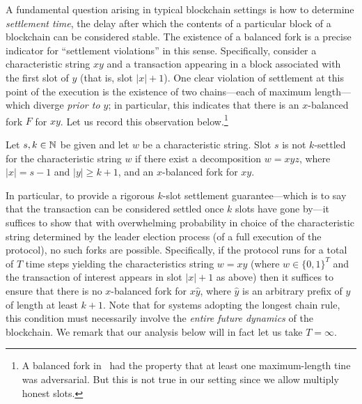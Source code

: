 A fundamental question arising in typical blockchain settings is how
to determine \emph{settlement time}, the delay after which the
contents of a particular block of a blockchain can be considered
stable. The existence of a balanced fork is a precise indicator for
``settlement violations'' in this sense. Specifically, consider a
characteristic string $xy$ and a transaction appearing in a block
associated with the first slot of $y$ (that is, slot $|x| + 1$). One
clear violation of settlement at this point of the execution is the
existence of two chains---each of maximum length---which diverge
\emph{prior to $y$}; in particular, this indicates that there is an
$x$-balanced fork $F$ for $xy$. Let us record this observation below.\footnote{
  A balanced fork in~\cite{LinearConsistency} 
  had the property that 
  at least one maximum-length tine was adversarial. 
  But this is not true in our setting since we allow multiply honest slots.
}


\begin{observation}\label{obs:settlement-balanced-fork-mh}
  Let $s, k \in \mathbb{N}$ be given and 
  let $w$ be a characteristic string. 
  Slot $s$ is not $k$-settled for the characteristic string $w$ 
  if 
  there exist a decomposition $w = xyz$, 
  where $|x| = s - 1$ and $|y| \geq k+1$, 
  and an $x$-balanced fork for $xy$. 
\end{observation}

In particular, to provide a rigorous $k$-slot settlement
guarantee---which is to say that the transaction can be considered
settled once $k$ slots have gone by---it suffices to show that with
overwhelming probability in choice of the characteristic string
determined by the leader election process (of a full execution of the
protocol), no such forks are possible. Specifically, if the protocol
runs for a total of $T$ time steps yielding the characteristics string
$w = xy$ (where $w \in \{0,1\}^T$ and the transaction of interest
appears in slot $|x| + 1$ as above) then it suffices to ensure that
there is no $x$-balanced fork for $x\hat{y}$, where $\hat{y}$ is an
arbitrary prefix of $y$ of length at least $k + 1$. 
Note that
for systems adopting the longest chain rule, this condition must
necessarily involve the \emph{entire future dynamics} of the
blockchain. We remark that our analysis below will in fact let us take
$T = \infty$.


